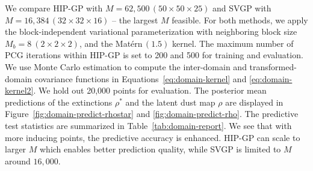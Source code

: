 We compare HIP-GP with $M=62{,}500 \,(50\times 50 \times 25)$
and SVGP with $M=16{,}384 \,(32 \times 32 \times 16)$ -- the largest $M$ feasible.
For both methods, we apply the block-independent variational
parameterization with neighboring block size $M_b = 8~(2\times2\times2)$,
and the Matérn$\,(1.5)$ kernel.
The maximum number of PCG iterations within HIP-GP is set to
200 and 500 for training and evaluation.
We use Monte Carlo estimation to compute the
inter-domain and transformed-domain covariance functions
in Equations~\ref{eq:domain-kernel} and \ref{eq:domain-kernel2}.
We hold out 20{,}000 points for evaluation.
The posterior mean predictions of the extinctions $\rho^*$
and the latent dust map $\rho$ are displayed in
Figure~\ref{fig:domain-predict-rhostar} and \ref{fig:domain-predict-rho}.
The predictive test statistics are summarized in Table~\ref{tab:domain-report}.
We see that with more inducing points, the predictive accuracy is enhanced.
HIP-GP can scale to larger $M$ which enables better prediction quality,
while SVGP is limited to $M$ around $16{,}000$.


